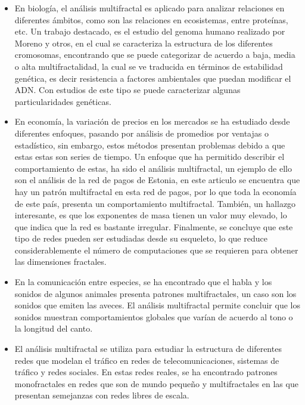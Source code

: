 \begin{itemize}
    \item En biología, el análisis multifractal es aplicado para analizar relaciones en diferentes ámbitos\cite{Barat2016}, como son las relaciones en ecosistemas, entre proteínas\cite{Wang2014}, etc. Un trabajo destacado, es el estudio del genoma humano realizado por Moreno y otros\cite{Moreno2011}, en el cual se caracteriza la estructura de los diferentes cromosomas, encontrando que se puede categorizar de acuerdo a baja, media o alta multifractalidad, la cual se ve traducida en términos de estabilidad genética, es decir resistencia a factores ambientales que puedan modificar el ADN. Con estudios de este tipo se puede caracterizar algunas particularidades genéticas.
    \item En economía, la variación de precios en los mercados se ha estudiado desde diferentes enfoques, pasando por análisis de promedios por ventajas o estadístico, sin embargo, estos métodos presentan problemas debido a que estas estas son series de tiempo\cite{Siokis2014}. Un enfoque que ha permitido describir el comportamiento de estas, ha sido el análisis multifractal, un ejemplo de ello son el análisis de la red de pagos de Estonia\cite{RendondelaTorre2017}, en este articulo se encuentra que hay un patrón multifractal en esta red de pagos, por lo que toda la economía de este país, presenta un comportamiento multifractal. También, un hallazgo interesante, es que los exponentes de masa tienen un valor muy elevado, lo que indica que la red es bastante irregular. Finalmente, se concluye que este tipo de redes pueden ser estudiadas desde su esqueleto, lo que reduce considerablemente el número de computaciones que se requieren para obtener las dimensiones fractales.
    \item En la comunicación entre especies, se ha encontrado que el habla y los sonidos de algunos animales presenta patrones multifractales, un caso son los sonidos que emiten las aveces\cite{Roeske2018}. El análisis multifractal permite concluir que los sonidos muestran comportamientos globales que varían de acuerdo al tono o la longitud del canto.
    \item El análisis multifractal se utiliza para estudiar la estructura de diferentes redes que modelan el tráfico en redes de telecomunicaciones\cite{DinhDang2004}, sistemas de tráfico\cite{Vojak1994} y redes sociales\cite{Wei2017}. En estas redes reales, se ha encontrado patrones monofractales en redes que son de mundo pequeño y multifractales en las que presentan semejanzas con redes libres de escala.
\end{itemize}